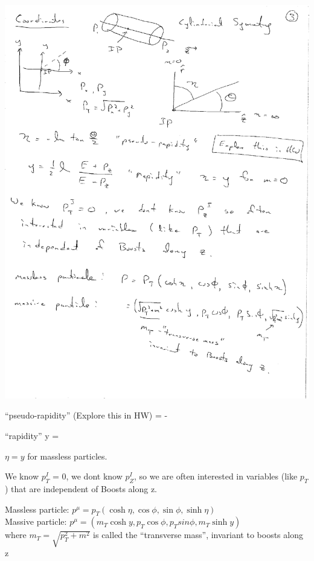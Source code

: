{\bc
\includegraphics[width=\textwidth]{./Coordinates.pdf}
\ec

``pseudo-rapidity''  (Explore this in HW)
\be
\eta = -\ln \tan {}
\ee

``rapidity''  
\be
y  =  \ln {}
\ee

$\eta = y$ for massless particles.


We know $p_T^I$ = 0, we dont know $p_Z^I$, so we are often interested in variables (like $p_T$) that are independent of Boosts along z.


Massless particle:  $p^\mu = p_T(\cosh \eta, \cos \phi, \sin \phi, \sinh \eta)$\\

Massive particle:  $p^\mu = (m_T \cosh y, p_T \cos \phi, p_T sin \phi, m_T \sinh y)$\\
where $m_T = \sqrt{p_T^2 + m^2}$ is called the ``transverse mass'', invariant to boosts along z

\lineacross

}
